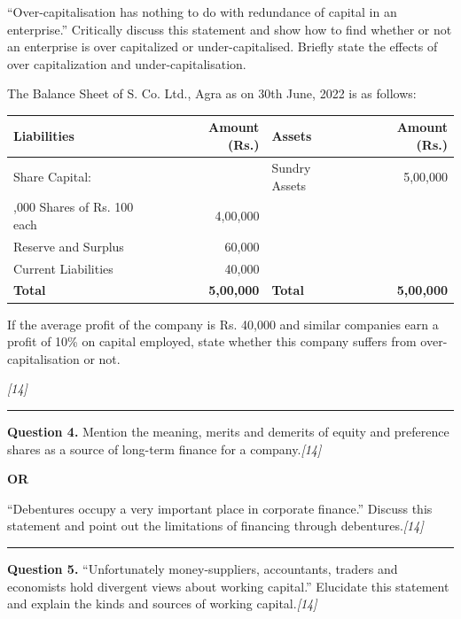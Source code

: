 \documentclass[11pt,a4paper]{article}
\newcommand{\pts}[1]{\hfill   \textit{[#1]}}
\begin{document}
\begin{parts}
  \item ``Over-capitalisation has nothing to do with redundance of capital in an enterprise.'' Critically discuss this statement and show how to find whether or not an enterprise is over capitalized or under-capitalised. Briefly state the effects of over capitalization and under-capitalisation.
  \item The Balance Sheet of S. Co. Ltd., Agra as on 30th June, 2022 is as follows:
  
  
\begin{center}
  \small
  
\begin{tabular}{|l|r||l|r|}
  \hline
   \textbf{Liabilities} &   \textbf{Amount (Rs.)} &   \textbf{Assets} &   \textbf{Amount (Rs.)} \\
  \hline
  Share Capital: & & Sundry Assets & 5,00,000 \\
  \quad 4,000 Shares of Rs. 100 each & 4,00,000 & & \\
  Reserve and Surplus & 60,000 & & \\
  Current Liabilities & 40,000 & & \\
  \hline
   \textbf{Total} &   \textbf{5,00,000} &   \textbf{Total} &   \textbf{5,00,000} \\
  \hline
  \end{tabular}
  \end{center}
  
  If the average profit of the company is Rs. 40,000 and similar companies earn a profit of 10\% on capital employed, state whether this company suffers from over-capitalisation or not.
\end{parts}\pts{14}

\medskip\rule{\linewidth}{0.2pt}




\noindent   \textbf{Question 4.}
Mention the meaning, merits and demerits of equity and preference shares as a source of long-term finance for a company.\pts{14}

\centerline{   \textbf{OR}}

``Debentures occupy a very important place in corporate finance.'' Discuss this statement and point out the limitations of financing through debentures.\pts{14}

\medskip\rule{\linewidth}{0.2pt}




\noindent   \textbf{Question 5.}
``Unfortunately money-suppliers, accountants, traders and economists hold divergent views about working capital.'' Elucidate this statement and explain the kinds and sources of working capital.\pts{14}
\end{document}
